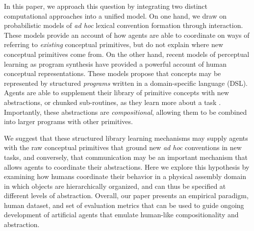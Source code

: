 \documentclass[10pt,letterpaper]{article}
\begin{document}
In this paper, we approach this question by integrating two distinct computational approaches into a unified model.
On one hand, we draw on probabilistic models of \emph{ad hoc} lexical convention formation \cite{hawkinsgeneralizing} through interaction.
These models provide an account of how agents are able to coordinate on ways of referring to \emph{existing} conceptual primitives, but do not explain where new conceptual primitives come from.
On the other hand, recent models of perceptual learning as program synthesis \cite{gulwani2017program} have provided a powerful account of human conceptual representations.
These models propose that concepts may be represented by structured \emph{programs} written in a domain-specific language (DSL). 
Agents are able to supplement their library of primitive concepts with new abstractions, or chunked sub-routines, as they learn more about a task \cite{ellis2020dreamcoder}.
Importantly, these abstractions are \emph{compositional}, allowing them to be combined into larger programs with other primitives.

We suggest that these structured library learning mechanisms may supply agents with the raw conceptual primitives that ground new \emph{ad hoc} conventions in new tasks, and conversely, that communication may be an important mechanism that allows agents to coordinate their abstractions.
Here we explore this hypothesis by examining how humans coordinate their behavior in a physical assembly domain \cite{bapst2019structured, mccarthy2020blocks} in which objects are hierarchically organized, and can thus be specified at different levels of abstraction.
Overall, our paper presents an empirical paradigm, human dataset, and set of evaluation metrics that can be used to guide ongoing development of artificial agents that emulate human-like compositionality and abstraction. 


\end{document}
